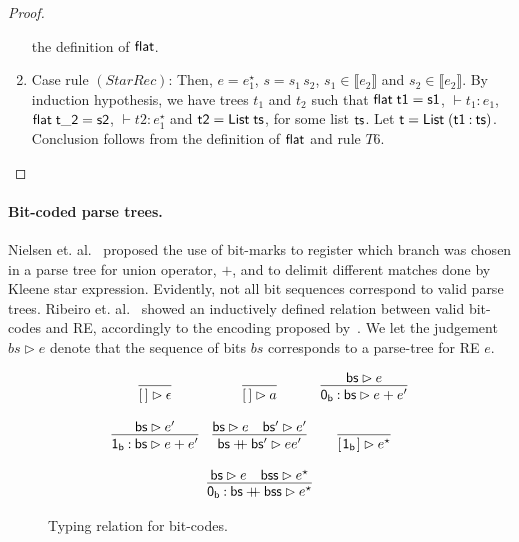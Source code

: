 \documentclass[sigplan]{acmart}
\newcommand{\plus}{\mathbin{+\!\!\!+}}
\theoremstyle{definition}
\newcommand{\sembrackets}[1]{\ensuremath{\llbracket #1 \rrbracket}}
\newcommand{\C}[1]{\red{\mathsf{#1}}}
\newcommand{\F}[1]{\green{\mathsf{#1}}}
\newcommand{\V}[1]{\black{\mathsf{#1}}}
\begin{document}
\begin{proof}
\begin{enumerate}
          the definition of \ensuremath{\F{flat}}.
    \item Case rule $(StarRec)$: Then, $e = e_1^\star$, $s = s_1\,s_2$, $s_1 \in\sembrackets{e_2}$ and
          $s_2 \in \sembrackets{e_2}$. By induction hypothesis, we have trees $t_1$ and $t_2$ such that
          \ensuremath{\F{flat}\;\V{t1}\mathrel{=}\V{s1}}, $\vdash t_1 : e_1$, \ensuremath{\F{flat}\;\V{t\char95 2}\mathrel{=}\V{s2}}, $\vdash t2 : e_1^\star$ and
          \ensuremath{\V{t2}\mathrel{=}\C{List}\;\V{ts}}, for some list \ensuremath{\V{ts}}. Let \ensuremath{\V{t}\mathrel{=}\C{List}\;(\V{t1}\mathbin{:}\V{ts})}. Conclusion follows from the
          definition of \ensuremath{\F{flat}} and rule $T6$.
  \end{enumerate}
\end{proof}

\paragraph{Bit-coded parse trees.} Nielsen et. al.~\cite{Lasse2011} proposed the
use of bit-marks to register which branch was chosen in a parse tree for union
operator, $+$, and to delimit different matches done by Kleene star expression.
Evidently, not all bit sequences correspond to valid parse trees. Ribeiro et. al.~\cite{Ribeiro2017}
showed an inductively defined relation between valid bit-codes and RE, accordingly to the encoding
proposed by~\cite{Lasse2011}. We let the judgement $bs \rhd e$ denote that the sequence of bits
$bs$ corresponds to a parse-tree for RE $e$.


\begin{figure}[h]
	\[
	\begin{array}{ccc}
	\infer{\ensuremath{[\mskip1.5mu \mskip1.5mu]} \rhd \epsilon}{} &
	\infer{\ensuremath{[\mskip1.5mu \mskip1.5mu]} \rhd a}{}  &
	\infer{\ensuremath{\C{0_b}\mathbin{:}\V{bs}} \rhd e + e'}{\ensuremath{\V{bs}} \rhd e} \\ \\
	\infer{\ensuremath{\C{1_b}\mathbin{:}\V{bs}} \rhd e + e'}{\ensuremath{\V{bs}} \rhd e'} &
	\infer{\ensuremath{\V{bs}\plus \V{bs'}} \rhd e e'}{\ensuremath{\V{bs}} \rhd e & \ensuremath{\V{bs'}} \rhd e'} &
	\infer{\ensuremath{[\mskip1.5mu \C{1_b}\mskip1.5mu]} \rhd e^\star}{} \\ \\
	\multicolumn{3}{c}{
		\infer{\ensuremath{\C{0_b}\mathbin{:}\V{bs}\plus \V{bss}} \rhd e^\star}{\ensuremath{\V{bs}} \rhd e & \ensuremath{\V{bss}} \rhd e^\star}
	}
	\end{array}
	\]
	\centering
	\caption{Typing relation for bit-codes.}
	\label{figure:typing-bitcodes}
\end{figure}
\end{document}
